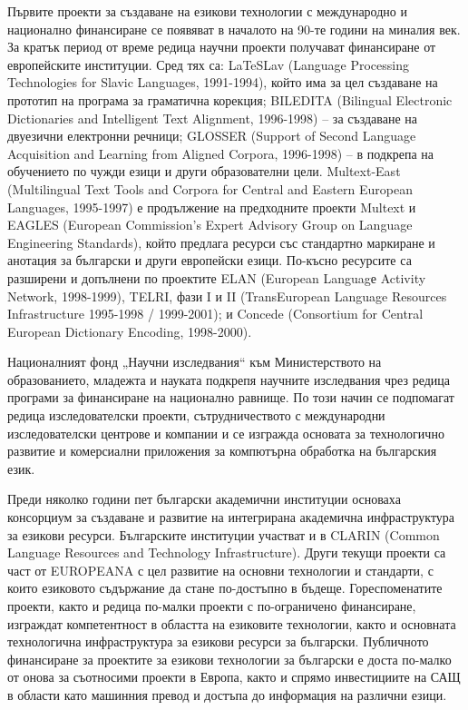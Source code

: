 \documentclass[]{../../metanetpaper}
\begin{document}
\begin{multicols}{2}
Първите проекти за създаване на езикови
 технологии с международно и национално финансиране
 се появяват в началото на 90-те години на миналия
 век. За кратък период от време редица научни проекти
 получават финансиране от европейските институции.
 Сред тях са: LaTeSLav (Language Processing Technologies for Slavic Languages, 1991-1994), който има за цел
 създаване на прототип на програма за граматична
 корекция; BILEDITA (Bilingual Electronic Dictionaries and Intelligent Text Alignment, 1996-1998) – за създаване на
 двуезични електронни речници; GLOSSER (Support of Second Language Acquisition and Learning from Aligned Corpora, 1996-1998)
 – в подкрепа на обучението по чужди езици и други
 образователни цели. Multext-East (Multilingual Text Tools and Corpora for Central and Eastern European Languages, 1995-1997) е
 продължение на предходните проекти Multext и EAGLES (European Commission's Expert Advisory Group on Language Engineering Standards), който предлага ресурси със стандартно маркиране
 и анотация за български
и други европейски езици. По-късно ресурсите са разширени и допълнени по проектите ELAN (European Languagе Activity Network, 1998-1999), TELRI, фази I и II (TransEuropean Language Resources Infrastructure 1995-1998 /
1999-2001); и Concede (Consortium for Central European
 Dictionary Encoding, 1998-2000).

Националният фонд „Научни изследвания“ към Министерството на образованието, младежта и науката
 подкрепя научните изследвания чрез редица програми
 за финансиране на национално равнище. По този начин се подпомагат редица изследователски проекти, сътрудничеството с международни изследователски
 центрове и компании и се изгражда основата
 за технологично развитие и комерсиални приложения за
компютърна обработка на българския език.

Преди няколко години пет български академични институции основаха консорциум за създаване и развитие на интегрирана академична инфраструктура за
 езикови ресурси. Българските институции участват и в
 CLARIN  (Common Language Resources and Technology Infrastructure). Други текущи проекти са част от EUROPEANA с
 цел развитие на основни технологии и стандарти, с които
езиковото съдържание да стане по-достъпно в бъдеще.
 Гореспоменатите проекти, както и редица по-малки
 проекти с по-ограничено финансиране, изграждат
 компетентност в областта на езиковите технологии,
 както и основната технологична инфраструктура за
 езикови ресурси за български. Публичното финансиране
 за проектите за езикови технологии за български е доста
 по-малко от онова за съотносими проекти в Европа, както
 и спрямо инвестициите на САЩ \cite{sprachtech} в области като машинния превод и достъпа до информация на различни езици.


\end{multicols}
\end{document}
